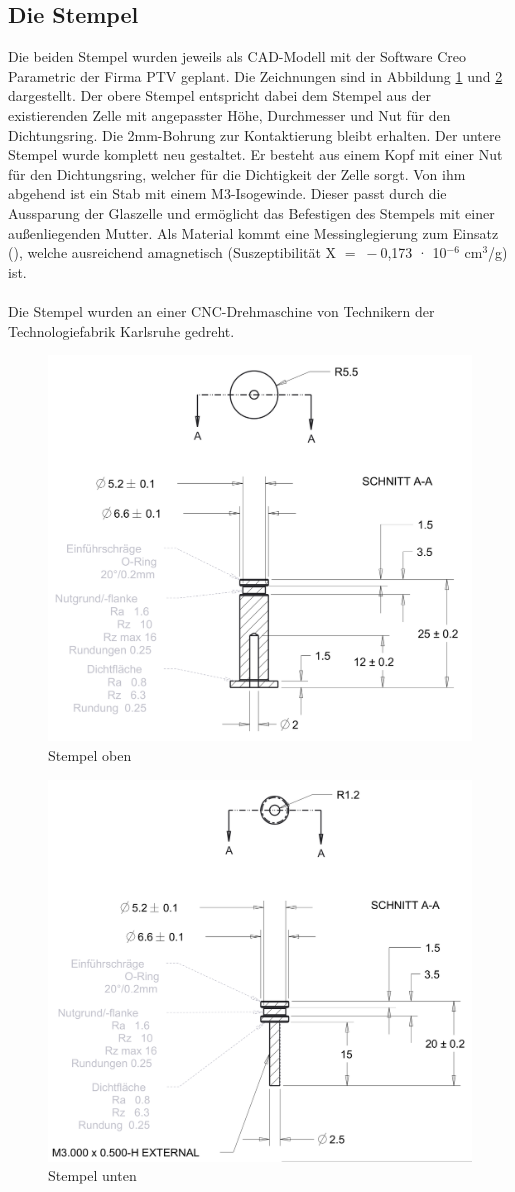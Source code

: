 \documentclass[a4paper, 11pt, headsepline,footsepline,twoside,abstract]{scrbook}
\begin{document}
\subsection{Die Stempel}
Die beiden Stempel wurden jeweils als CAD-Modell mit der Software Creo Parametric der Firma PTV geplant. Die Zeichnungen sind in Abbildung \ref{stempel_oben} und \ref{stempel_unten} dargestellt. Der obere Stempel entspricht dabei dem Stempel aus der existierenden Zelle mit angepasster Höhe, Durchmesser und Nut für den Dichtungsring. Die 2mm-Bohrung zur Kontaktierung bleibt erhalten. Der untere Stempel wurde komplett neu gestaltet. Er besteht aus einem Kopf mit einer Nut für den Dichtungsring, welcher für die Dichtigkeit der Zelle sorgt. Von ihm abgehend ist ein Stab mit einem M3-Isogewinde. Dieser passt durch die Aussparung der Glaszelle und ermöglicht das Befestigen des Stempels mit einer außenliegenden Mutter. Als Material kommt eine Messinglegierung zum Einsatz (), welche ausreichend amagnetisch (Suszeptibilität X $=\;-$0,173 · 10$^{-6}$ cm$^3$/g) ist. 
\\\\
Die Stempel wurden an einer CNC-Drehmaschine von Technikern der Technologiefabrik Karlsruhe gedreht. %
\begin{figure}
	\centering
	\includegraphics[width=0.7\columnwidth]{images/stempel_oben.png}
	\caption{Stempel oben}
	\label{stempel_oben}
\end{figure}
\begin{figure}
	\centering
	\includegraphics[width=0.7\columnwidth]{images/stempel_unten.png}
	\caption{Stempel unten}
	\label{stempel_unten}
\end{figure}
\end{document}
